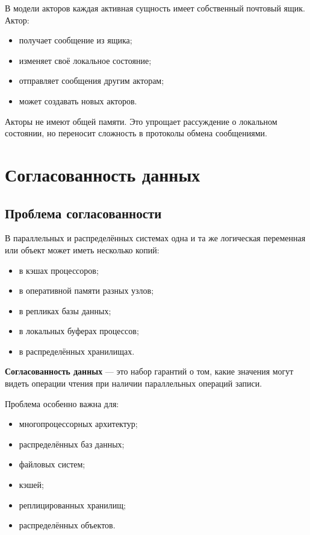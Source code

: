 \documentclass[12pt,a4paper]{article}
\begin{document}
В модели акторов каждая активная сущность имеет собственный почтовый ящик. Актор:
\begin{itemize}
    \item получает сообщение из ящика;
    \item изменяет своё локальное состояние;
    \item отправляет сообщения другим акторам;
    \item может создавать новых акторов.
\end{itemize}

Акторы не имеют общей памяти. Это упрощает рассуждение о локальном состоянии, но переносит сложность в протоколы обмена сообщениями.

\section{Согласованность данных}

\subsection{Проблема согласованности}

В параллельных и распределённых системах одна и та же логическая переменная или объект может иметь несколько копий:
\begin{itemize}
    \item в кэшах процессоров;
    \item в оперативной памяти разных узлов;
    \item в репликах базы данных;
    \item в локальных буферах процессов;
    \item в распределённых хранилищах.
\end{itemize}

\textbf{Согласованность данных} --- это набор гарантий о том, какие значения могут видеть операции чтения при наличии параллельных операций записи.

Проблема особенно важна для:
\begin{itemize}
    \item многопроцессорных архитектур;
    \item распределённых баз данных;
    \item файловых систем;
    \item кэшей;
    \item реплицированных хранилищ;
    \item распределённых объектов.
\end{itemize}
\end{document}
